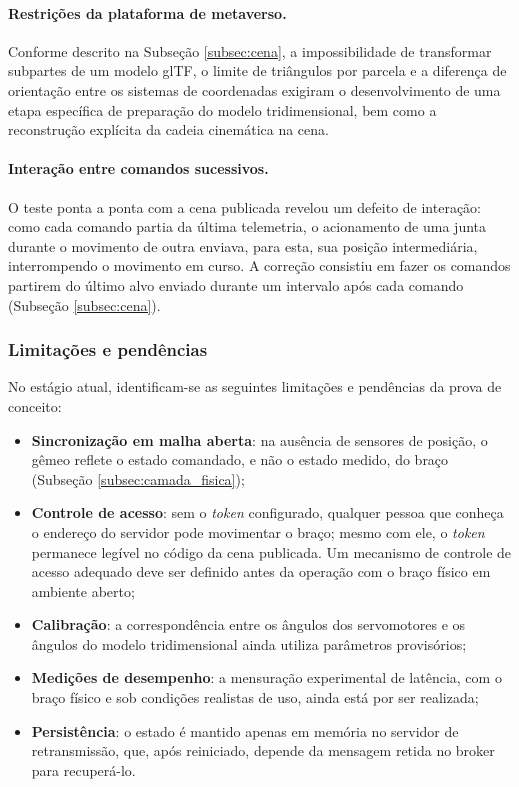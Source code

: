 \documentclass[12pt]{article}
\begin{document}
\paragraph{Restrições da plataforma de metaverso.} Conforme descrito na Subseção \ref{subsec:cena}, a impossibilidade de transformar subpartes de um modelo glTF, o limite de triângulos por parcela e a diferença de orientação entre os sistemas de coordenadas exigiram o desenvolvimento de uma etapa específica de preparação do modelo tridimensional, bem como a reconstrução explícita da cadeia cinemática na cena.

\paragraph{Interação entre comandos sucessivos.} O teste ponta a ponta com a cena publicada revelou um defeito de interação: como cada comando partia da última telemetria, o acionamento de uma junta durante o movimento de outra enviava, para esta, sua posição intermediária, interrompendo o movimento em curso. A correção consistiu em fazer os comandos partirem do último alvo enviado durante um intervalo após cada comando (Subseção \ref{subsec:cena}).

\subsubsection{Limitações e pendências}
\label{subsec:pendencias}

No estágio atual, identificam-se as seguintes limitações e pendências da prova de conceito:

\begin{itemize}
    \item \textbf{Sincronização em malha aberta}: na ausência de sensores de posição, o gêmeo reflete o estado comandado, e não o estado medido, do braço (Subseção \ref{subsec:camada_fisica});
    \item \textbf{Controle de acesso}: sem o \textit{token} configurado, qualquer pessoa que conheça o endereço do servidor pode movimentar o braço; mesmo com ele, o \textit{token} permanece legível no código da cena publicada. Um mecanismo de controle de acesso adequado deve ser definido antes da operação com o braço físico em ambiente aberto;
    \item \textbf{Calibração}: a correspondência entre os ângulos dos servomotores e os ângulos do modelo tridimensional ainda utiliza parâmetros provisórios;
    \item \textbf{Medições de desempenho}: a mensuração experimental de latência, com o braço físico e sob condições realistas de uso, ainda está por ser realizada;
    \item \textbf{Persistência}: o estado é mantido apenas em memória no servidor de retransmissão, que, após reiniciado, depende da mensagem retida no broker para recuperá-lo.
\end{itemize}
\end{document}
